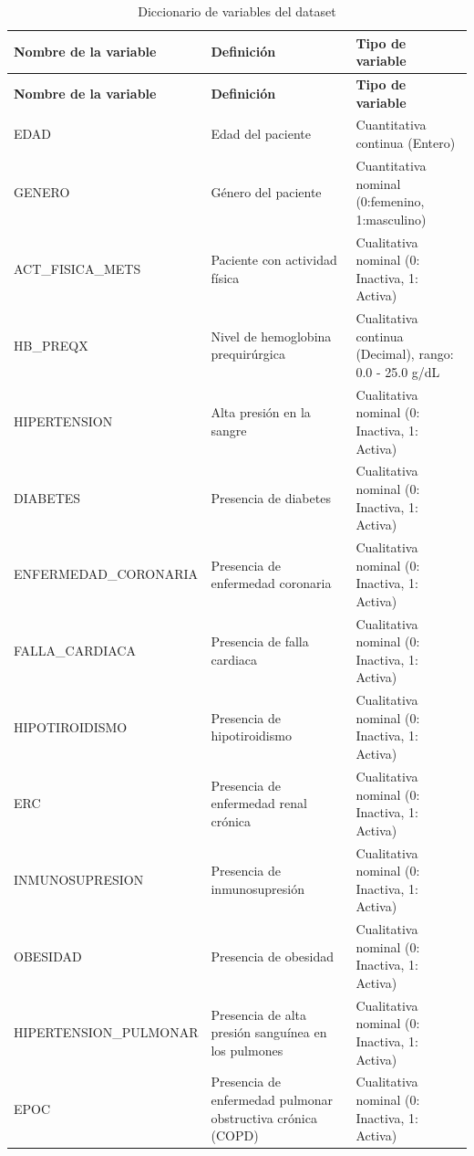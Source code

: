 \documentclass[12pt, letterpaper]{article}
\renewcommand{\arraystretch}{1.5}
\begin{document}
\begin{center}
\scriptsize 
\renewcommand{\arraystretch}{1.4} 
\begin{xltabular}{\textwidth}{|>{\raggedright\arraybackslash}p{5cm}|>{\raggedright\arraybackslash}X|>{\raggedright\arraybackslash}p{4cm}|}
\caption{Diccionario de variables del dataset} \label{tab:diccionario} \\
\hline
\textbf{Nombre de la variable} & \textbf{Definición} & \textbf{Tipo de variable} \\ \hline
\endfirsthead
\hline
\textbf{Nombre de la variable} & \textbf{Definición} & \textbf{Tipo de variable} \\ \hline
\endhead
\hline
\endfoot
\hline
\endlastfoot
EDAD & Edad del paciente & Cuantitativa continua (Entero) \\ \hline
GENERO & Género del paciente & Cuantitativa nominal (0:femenino, 1:masculino) \\ \hline
ACT\_FISICA\_METS & Paciente con actividad física & Cualitativa nominal (0: Inactiva, 1: Activa) \\ \hline
HB\_PREQX & Nivel de hemoglobina prequirúrgica & Cualitativa continua (Decimal), rango: 0.0 - 25.0 g/dL \\ \hline
HIPERTENSION & Alta presión en la sangre & Cualitativa nominal (0: Inactiva, 1: Activa) \\ \hline
DIABETES & Presencia de diabetes & Cualitativa nominal (0: Inactiva, 1: Activa) \\ \hline
ENFERMEDAD\_CORONARIA & Presencia de enfermedad coronaria & Cualitativa nominal (0: Inactiva, 1: Activa) \\ \hline
FALLA\_CARDIACA & Presencia de falla cardiaca & Cualitativa nominal (0: Inactiva, 1: Activa) \\ \hline
HIPOTIROIDISMO & Presencia de hipotiroidismo & Cualitativa nominal (0: Inactiva, 1: Activa) \\ \hline
ERC & Presencia de enfermedad renal crónica & Cualitativa nominal (0: Inactiva, 1: Activa) \\ \hline
INMUNOSUPRESION & Presencia de inmunosupresión & Cualitativa nominal (0: Inactiva, 1: Activa) \\ \hline
OBESIDAD & Presencia de obesidad & Cualitativa nominal (0: Inactiva, 1: Activa) \\ \hline
HIPERTENSION\_PULMONAR & Presencia de alta presión sanguínea en los pulmones & Cualitativa nominal (0: Inactiva, 1: Activa) \\ \hline
EPOC & Presencia de enfermedad pulmonar obstructiva crónica (COPD) & Cualitativa nominal (0: Inactiva, 1: Activa) \\ \hline

\end{xltabular}
\end{center}
\end{document}
